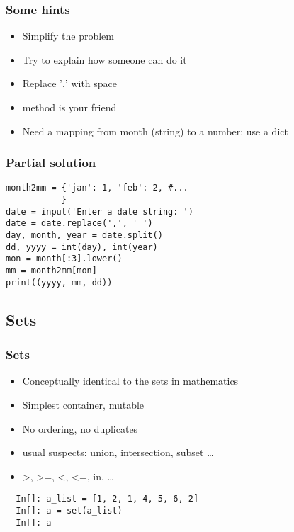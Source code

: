\documentclass[14pt,compress]{beamer}
\begin{document}
\begin{frame}[fragile]
  \frametitle{Some hints}
  \begin{itemize}
  \item Simplify the problem
  \item Try to explain how someone can do it
    \vspace*{2em}

  \item Replace ',' with space
  \item {} method is your friend
  \item Need a mapping from month (string) to a number: use a dict
  \end{itemize}
\end{frame}

\begin{frame}[fragile]
  \frametitle{Partial solution}
\begin{lstlisting}
month2mm = {'jan': 1, 'feb': 2, #...
           }
date = input('Enter a date string: ')
date = date.replace(',', ' ')
day, month, year = date.split()
dd, yyyy = int(day), int(year)
mon = month[:3].lower()
mm = month2mm[mon]
print((yyyy, mm, dd))
\end{lstlisting}
\end{frame}

\subsection{Sets}
\begin{frame}[fragile]
  \frametitle{Sets}
  \begin{itemize}
  \item Conceptually identical to the sets in mathematics
  \item Simplest container, mutable
  \item No ordering, no duplicates
  \item usual suspects: union, intersection, subset \ldots
  \item >, >=, <, <=, in, \ldots
  \end{itemize}
  \begin{lstlisting}
  In[]: a_list = [1, 2, 1, 4, 5, 6, 2]
  In[]: a = set(a_list)
  In[]: a
  \end{lstlisting}
\end{frame}
\end{document}
